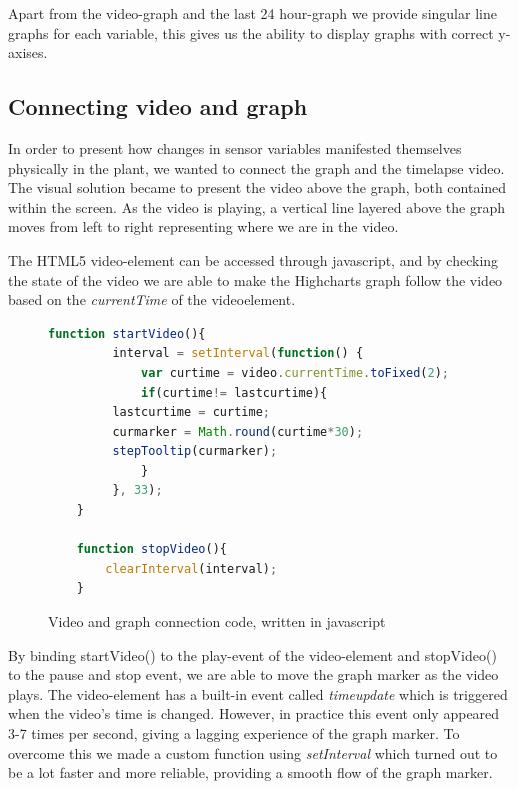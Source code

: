 Apart from the video-graph and the last 24 hour-graph we provide singular line graphs for each variable, this gives us the ability to display graphs with correct y-axises. 

\subsection{Connecting video and graph}
In order to present how changes in sensor variables manifested themselves physically in the plant, we wanted to connect the graph and the timelapse video. The visual solution became to present the video above the graph, both contained within the screen. As the video is playing, a vertical line layered above the graph moves from left to right representing where we are in the video. 

The HTML5 video-element can be accessed through javascript, and by checking the state of the video we are able to make the Highcharts graph follow the video based on the \emph{currentTime} of the videoelement.

\begin{figure}
	\begin{lstlisting}[language=javascript]
	function startVideo(){
	     interval = setInterval(function() {
	         var curtime = video.currentTime.toFixed(2);
	         if(curtime!= lastcurtime){
		 lastcurtime = curtime;
		 curmarker = Math.round(curtime*30);
		 stepTooltip(curmarker);
	         }
	     }, 33);
	}

	function stopVideo(){
		clearInterval(interval);
	}
	\end{lstlisting}
	\caption{Video and graph connection code, written in javascript}
	\label{fig:videocode}
\end{figure}

By binding startVideo() to the play-event of the video-element and stopVideo() to the pause and stop event, we are able to move the graph marker as the video plays. The video-element has a built-in event called \emph{timeupdate} which is triggered when the video's time is changed. However, in practice this event only appeared 3-7 times per second, giving a lagging experience of the graph marker. To overcome this we made a custom function using \emph{setInterval} which turned out to be a lot faster and more reliable, providing a smooth flow of the graph marker. 


